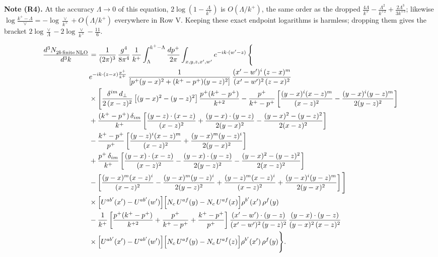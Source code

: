 \documentclass[9pt]{article}
\numberwithin{equation}{section}
\begin{document}
\begingroup\color{blue}\noindent\textbf{Note (R4).} At the accuracy $\Lambda\to0$ of this equation, $2\log(1-\frac{\Lambda}{k^{+}})$ is $O(\Lambda/k^{+})$, the same order as the dropped $\frac{4\Lambda}{k^{+}}-\frac{\Lambda^{2}}{k^{+2}}+\frac{2\Lambda^{3}}{3k^{+3}}$; likewise $\log\frac{k^{+}-\Lambda}{\vee}=-\log\frac{\vee}{k^{+}}+O(\Lambda/k^{+})$ everywhere in Row V. Keeping these exact endpoint logarithms is harmless; dropping them gives the bracket $2\log\frac{\vee}{\Lambda}-2\log\frac{\vee}{k^{+}}-\frac{11}{6}$.\par\endgroup
\begin{align}
\frac{d^{3}N_{2b\,\rm finite\, NLO}^{\rm}}{d^{3}k} & = \frac{1}{(2\pi)^{3}}\,\frac{g^{4}}{8\pi^{4}}\,\frac{1}{k^{+}}\int_{\Lambda}^{k^{+}-\Lambda}\frac{dp^{+}}{2\pi}\int_{x,y,z,x',w'}e^{-ik\cdot(w'-z)}\,\Bigg\{\notag\\
&e^{-ik\cdot(z-x)\frac{p^{+}}{k^{+}}}\,\frac{1}{\left[p^{+}(y-x)^{2}+(k^{+}-p^{+})(y-z)^{2}\right]}\,\frac{(x'-w')^{i}\,(z-x)^{m}}{(x'-w')^{2}\,(z-x)^{2}}\notag\\
&\times\Bigg[\frac{\delta^{im}\,d_{\perp}}{2\,(x-z)^{2}}\left[(y-x)^{2}-(y-z)^{2}\right]\frac{p^{+}(k^{+}-p^{+})}{k^{+2}}
-\frac{p^{+}}{k^{+}-p^{+}}\left[\frac{(y-x)^{i}(x-z)^{m}}{(x-z)^{2}}-\frac{(y-x)^{i}(y-z)^{m}}{2(y-z)^{2}}\right]\notag\\
&+\frac{(k^{+}-p^{+})\,\delta_{im}}{k^{+}}\left[\frac{(y-z)\cdot(x-z)}{(x-z)^{2}}+\frac{(y-x)\cdot(y-z)}{2(y-x)^{2}}-\frac{(y-x)^{2}-(y-z)^{2}}{2(x-z)^{2}}\right]\notag\\
&-\frac{k^{+}-p^{+}}{p^{+}}\left[\frac{(y-z)^{i}(x-z)^{m}}{(x-z)^{2}}+\frac{(y-x)^{m}(y-z)^{i}}{2(y-x)^{2}}\right]\notag\\
&+\frac{p^{+}\,\delta_{im}}{k^{+}}\left[\frac{(y-x)\cdot(x-z)}{(x-z)^{2}}-\frac{(y-x)\cdot(y-z)}{2(y-z)^{2}}-\frac{(y-x)^{2}-(y-z)^{2}}{2(x-z)^{2}}\right]\notag\\
&-\left[\frac{(y-x)^{m}(x-z)^{i}}{(x-z)^{2}}-\frac{(y-x)^{m}(y-z)^{i}}{2(y-z)^{2}}+\frac{(y-z)^{m}(x-z)^{i}}{(x-z)^{2}}+\frac{(y-x)^{i}(y-z)^{m}}{2(y-x)^{2}}\right]\Bigg]\notag\\
&\times\Big[U^{ab'}(x')-U^{ab'}(w')\Big]\Big[N_{c}\,U^{af}(y)-N_{c}\,U^{af}(x)\Big]\rho^{b'}(x')\,\rho^{f}(y)\notag\\
&-\frac{1}{k^{+}}\left[\frac{p^{+}(k^{+}-p^{+})}{k^{+2}}+\frac{p^{+}}{k^{+}-p^{+}}+\frac{k^{+}-p^{+}}{p^{+}}\right]
\frac{(x'-w')\cdot(y-z)}{(x'-w')^{2}\,(y-z)^{2}}\,\frac{(y-x)\cdot(y-z)}{(y-x)^{2}\,(x-z)^{2}}\notag\\
&\times\Big[U^{ab'}(x')-U^{ab'}(w')\Big]\Big[N_{c}\,U^{af}(y)-N_{c}\,U^{af}(z)\Big]\rho^{b'}(x')\,\rho^{f}(y)\Bigg\}.
\end{align}
\end{document}
